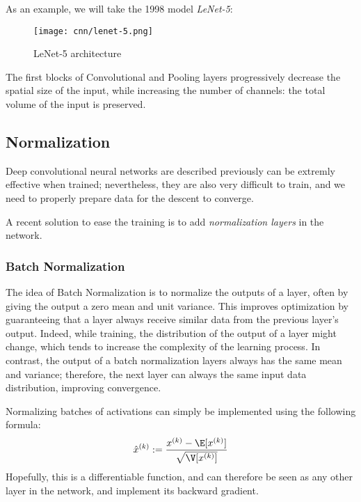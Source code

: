 As an example, we will take the 1998 model \emph{LeNet-5}:
\begin{figure}[H]
    \centering
    \texttt{[image: cnn/lenet-5.png]}
    \caption{LeNet-5 architecture}
\end{figure}
The first blocks of Convolutional and Pooling layers progressively decrease the spatial size of the input, while increasing the number of channels: the total volume of the input is preserved.

\subsection{Normalization}
Deep convolutional neural networks are described previously can be extremly effective when trained; nevertheless, they are also very difficult to train, and we need to properly prepare data for the descent to converge.

A recent solution to ease the training is to add \emph{normalization layers} in the network.

\subsubsection{Batch Normalization}
The idea of Batch Normalization is to normalize the outputs of a layer, often by giving the output a zero mean and unit variance. This improves optimization by guaranteeing that a layer always receive similar data from the previous layer's output. Indeed, while training, the distribution of the output of a layer might change, which tends to increase the complexity of the learning process. In contrast, the output of a batch normalization layers always has the same mean and variance; therefore, the next layer can always  the same input data distribution, improving convergence.

Normalizing batches of activations can simply be implemented using the following formula:
\begin{equation*}
    \hat{x}^{(k)} := \frac{x^{(k)} - \E[x^{(k)}]}{\sqrt{\V[x^{(k)}]}}
\end{equation*}
Hopefully, this is a differentiable function, and can therefore be seen as any other layer in the network, and implement its backward gradient.

